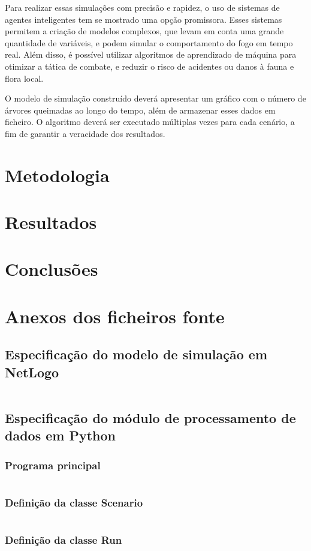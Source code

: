 \documentclass[a4paper, portuguese]{report}
\begin{document}
Para realizar essas simulações com precisão e rapidez, o uso de sistemas de agentes inteligentes tem se mostrado uma opção promissora. Esses sistemas permitem a criação de modelos complexos, que levam em conta uma grande quantidade de variáveis, e podem simular o comportamento do fogo em tempo real. Além disso, é possível utilizar algoritmos de aprendizado de máquina para otimizar a tática de combate, e reduzir o risco de acidentes ou danos à fauna e flora local.

O modelo de simulação construído deverá apresentar um gráfico com o número de árvores queimadas ao longo do tempo, além de armazenar esses dados em ficheiro. O algoritmo deverá ser executado múltiplas vezes para cada cenário, a fim de garantir a veracidade  dos resultados.

\chapter{Metodologia}\label{chapter:methodology}


\chapter{Resultados}\label{chapter:results}


\chapter{Conclusões}


\appendix
\chapter{Anexos dos ficheiros fonte}\label{chapter:appendix}
\section{Especificação do modelo de simulação em NetLogo}\label{sec:model_spec}
\inputminted[breaklines]{nl-lexer.py:NetLogoLexer -x}{../src/forest_fire.nlogo}

\section{Especificação do módulo de processamento de dados em Python}\label{sec:data_proc}
\subsection{Programa principal}
\inputminted[breaklines]{python}{../src/main.py}

\subsection{Definição da classe Scenario}
\inputminted[breaklines]{python}{../src/forestfire/scenario.py}

\subsection{Definição da classe Run}
\inputminted[breaklines]{python}{../src/forestfire/run.py}



\end{document}
